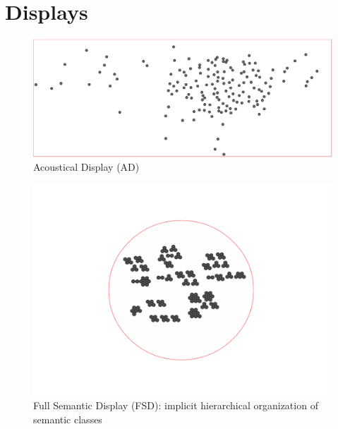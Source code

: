 \documentclass{aes2e}
\begin{document}

\section{Displays} \label{display}

\begin{figure}[t]
\begin{center}
\includegraphics[scale=0.18]{gfx/xp3.png} 
\end{center}
\caption{\label{figXP3} Acoustical Display (AD)}
\end{figure}

\begin{figure}[t!]
\begin{center}
\includegraphics[scale=0.30]{gfx/XP2clean.pdf} 
\end{center}
\caption{\label{figXP2} Full Semantic Display (FSD): implicit hierarchical organization of semantic classes }
\end{figure}
\end{document}
